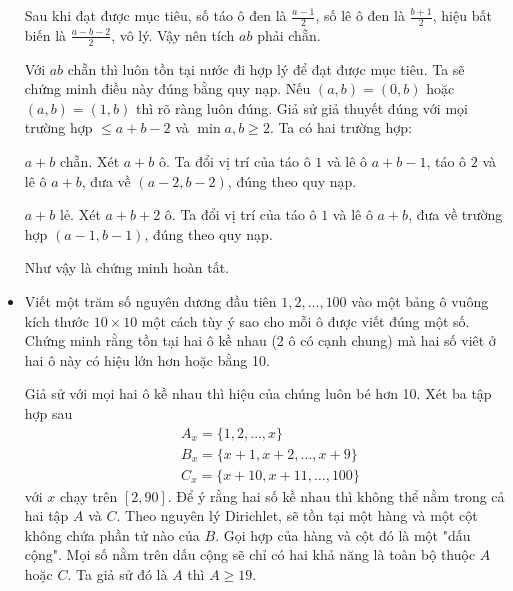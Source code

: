 \documentclass[11pt]{scrartcl}
\begin{document}
\begin{itemize}[label=, leftmargin=0em, itemsep=0.5em]
\begin{sol}
        Sau khi đạt được mục tiêu, số táo ô đen là $\frac{a - 1}{2}$, số lê ô đen là $\frac{b  + 1}{2}$, hiệu bất biến là $\frac{a - b - 2}{2}$, vô lý. Vậy nên tích $ab$ phải chẵn.

         Với $ab$ chẵn thì luôn tồn tại nước đi hợp lý để đạt được mục tiêu. Ta sẽ chứng minh điều này đúng bằng quy nạp. Nếu $(a, b) = (0,b)$ hoặc $(a,b) = (1,b)$ thì rõ ràng luôn đúng. Giả sử giả thuyết đúng với mọi trường hợp $ \leq a + b - 2$ và $\min{a,b} \geq 2$. Ta có hai trường hợp:
        
        $a + b$ chẵn. Xét $a + b$ ô. Ta đổi vị trí của táo ô $1$ và lê ô $a + b - 1$, táo ô $2$ và lê ô $a + b$, đưa về $(a - 2, b - 2)$, đúng theo quy nạp.
        
        $a + b$ lẻ. Xét $a + b + 2$ ô. Ta đổi vị trí của táo ô $1$ và lê ô $a + b$, đưa về trường hợp $(a - 1, b - 1)$, đúng theo quy nạp.

        Như vậy là chứng minh hoàn tất.
    \end{sol}

    
    \item \begin{bt}
        Viết một trăm số nguyên dương đầu tiên $1,2,\dots,100$ vào một bảng ô vuông kích thước $10\times 10$ một cách tùy ý sao cho mỗi ô được viết đúng một số. Chứng minh rằng tồn tại hai ô kề nhau (2 ô có cạnh chung) mà hai số viêt ở hai ô này có hiệu lớn hơn hoặc bằng 10.
    \end{bt}
    \begin{sol}
        Giả sử với mọi hai ô kề nhau thì hiệu của chúng luôn bé hơn 10. Xét ba tập hợp sau 
        \[
            \begin{aligned}
                &A_x = \{1,2,\dots,x\}\\
                &B_x = \{x + 1, x+ 2,\dots,x +9\}\\
                &C_x = \{x + 10, x + 11,\dots, 100\}
            \end{aligned}
        \]
        với $x$ chạy trên $[2,90]$. Để ý rằng hai số kề nhau thì không thể nằm trong cả hai tập $A$ và $C$. Theo nguyên lý Dirichlet, sẽ tồn tại một hàng và một cột không chứa phần tử nào của $B$. Gọi hợp của hàng và cột đó là một "dấu cộng". Mọi số nằm trên dấu cộng sẽ chỉ có hai khả năng là toàn bộ thuộc $A$ hoặc $C$. Ta giả sử đó là $A$ thì $A \geq 19$. 


\end{sol}
\end{itemize}
\end{document}
